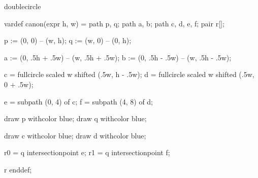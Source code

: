 %
%
%


\startenvironment doublecircle

	\startMPdefinitions
		vardef canon(expr h, w) =
			path p, q;
			path a, b;
			path c, d, e, f;
			pair r[];


			p := (0, 0) -- (w, h);
			q := (w, 0) -- (0, h);

			a := (0, .5h + .5w) -- (w, .5h + .5w); %
			b := (0, .5h - .5w) -- (w, .5h - .5w); %

			c = fullcircle scaled w shifted (.5w, h - .5w); %
			d = fullcircle scaled w shifted (.5w, 0 + .5w); %

			e = subpath (0, 4) of c; %
			f = subpath (4, 8) of d; %

			draw p withcolor blue;
			draw q withcolor blue;

			draw c withcolor blue;
			draw d withcolor blue;

			r0 = q intersectionpoint e; %
			r1 = q intersectionpoint f; %

			r
		enddef;
	\stopMPdefinitions

\stopenvironment

